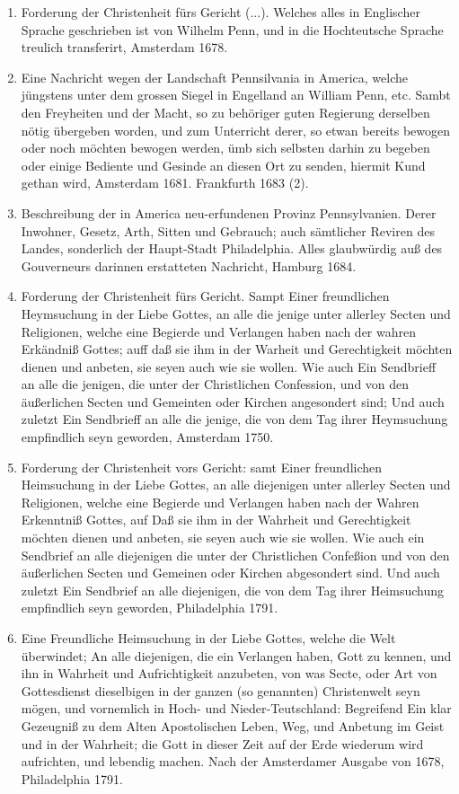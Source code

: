 \begin{enumerate}
 \item Forderung der Christenheit fürs Gericht (...). Welches alles in
Englischer Sprache geschrieben ist von Wilhelm Penn, und in die Hochteutsche
Sprache treulich transferirt, Amsterdam 1678.
 \item Eine Nachricht wegen der Landschaft Pennsilvania in America, welche
jüngstens unter dem grossen Siegel in Engelland an William Penn, etc. Sambt
den Freyheiten und der Macht, so zu behöriger guten Regierung derselben nötig
übergeben worden, und zum Unterricht derer,
so etwan bereits bewogen oder noch möchten bewogen werden,
ümb sich selbsten darhin zu begeben oder einige
Bediente und Gesinde an diesen Ort zu senden, hiermit Kund gethan wird,
Amsterdam 1681. Frankfurth 1683 (2).
 \item Beschreibung der in America neu-erfundenen Provinz Pennsylvanien. Derer
Inwohner, Gesetz, Arth, Sitten und Gebrauch; auch sämtlicher Reviren des
Landes, sonderlich der Haupt-Stadt Philadelphia. Alles glaubwürdig auß des
Gouverneurs darinnen erstatteten Nachricht, Hamburg 1684.
 \item Forderung der Christenheit fürs Gericht. Sampt Einer freundlichen
Heymsuchung in der Liebe Gottes, an alle die jenige unter allerley Secten und
Religionen, welche eine Begierde und Verlangen haben nach der wahren Erkändniß
Gottes; auff daß sie ihm in der Warheit und Gerechtigkeit möchten dienen und
anbeten, sie seyen auch wie sie wollen. Wie auch Ein Sendbrieff an alle die
jenigen, die unter der Christlichen Confession, und von den äußerlichen Secten
und Gemeinten oder Kirchen angesondert sind; Und auch zuletzt Ein Sendbrieff
an alle die jenige, die von dem Tag ihrer Heymsuchung empfindlich seyn geworden,
Amsterdam 1750.
 \item Forderung der Christenheit vors Gericht: samt Einer freundlichen
Heimsuchung in der Liebe Gottes, an alle diejenigen unter allerley Secten und
Religionen, welche eine Begierde und Verlangen haben nach der Wahren
Erkenntniß
Gottes, auf Daß sie
ihm in der Wahrheit und
Gerechtigkeit möchten
dienen und
anbeten, sie seyen auch wie sie wollen. Wie auch ein Sendbrief an alle
diejenigen die unter der Christlichen Confeßion und von den äußerlichen Secten
und Gemeinen oder Kirchen abgesondert sind. Und auch zuletzt Ein Sendbrief an
alle diejenigen, die von dem Tag ihrer Heimsuchung empfindlich seyn geworden,
Philadelphia 1791.

 \item Eine Freundliche Heimsuchung in der Liebe Gottes, welche die Welt
überwindet; An alle diejenigen, die ein Verlangen haben, Gott zu kennen, und
ihn
in Wahrheit und
Aufrichtigkeit anzubeten,
von was Secte,
oder Art von
Gottesdienst dieselbigen in der ganzen (so genannten) Christenwelt seyn mögen,
und vornemlich in Hoch- und Nieder-Teutschland: Begreifend Ein klar Gezeugniß
zu
dem Alten Apostolischen Leben, Weg, und Anbetung im Geist und in der Wahrheit;
die Gott in dieser Zeit auf der Erde wiederum wird aufrichten, und lebendig
machen. Nach der
Amsterdamer Ausgabe von
1678, Philadelphia 1791.


\end{enumerate}
